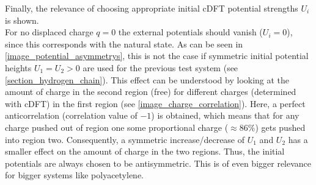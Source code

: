 Finally, the relevance of choosing appropriate initial cDFT potential strengths $U_i$ is shown.\\ For no displaced charge $q = 0$ the external potentials should vanish ($U_i = 0$), since this corresponds with the natural state. As can be seen in \cref{image_potential_asymmetrys}, this is not the case if symmetric initial potential heights $U_1 = U_2 > 0$ are used for the previous test system (see \cref{section_hydrogen_chain}). This effect can be understood by looking at the amount of charge in the second region (free) for different charges (determined with cDFT) in the first region (see \cref{image_charge_correlation}). Here, a perfect anticorrelation (correlation value of $-1$) is obtained, which means that for any charge pushed out of region one some proportional charge ($\approx 86\%$) gets pushed into region two. Consequently, a symmetric increase/decrease of $U_1$ and $U_2$ has a smaller effect on the amount of charge in the two regions.  Thus, the initial potentials are always chosen to be antisymmetric. This is of even bigger relevance for bigger systems like polyacetylene.
